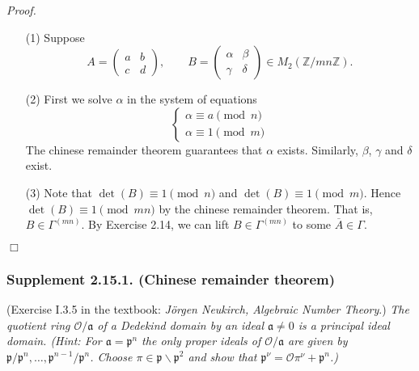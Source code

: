 \documentclass{article}
\begin{document}
\emph{Proof.}
\begin{enumerate}
\item[(1)]
  Suppose
  \[
    A =
    \begin{pmatrix}
      a & b \\
      c & d
    \end{pmatrix}, \qquad
    B =
    \begin{pmatrix}
      \alpha & \beta \\
      \gamma & \delta
    \end{pmatrix} \in M_2(\mathbb{Z}/mn\mathbb{Z}).
  \]

\item[(2)]
  First we solve $\alpha$ in the system of equations
  \begin{equation*}
    \begin{cases}
      \alpha \equiv a \pmod{n} \\
      \alpha \equiv 1 \pmod{m}
    \end{cases}
  \end{equation*}
  The chinese remainder theorem guarantees that $\alpha$ exists.
  Similarly, $\beta$, $\gamma$ and $\delta$ exist.

\item[(3)]
  Note that $\det(B) \equiv 1 \pmod{n}$ and $\det(B) \equiv 1 \pmod{m}$.
  Hence $\det(B) \equiv 1 \pmod{mn}$ by the chinese remainder theorem.
  That is, $B \in \Gamma^{(mn)}$.
  By Exercise 2.14, we can lift $B \in \Gamma^{(mn)}$ to some $\overline{A} \in \Gamma$.
\end{enumerate}
$\Box$ \\



\subsubsection*{Supplement 2.15.1. (Chinese remainder theorem)}
(Exercise I.3.5 in the textbook: \emph{J\"orgen Neukirch, Algebraic Number Theory}.)
\emph{The quotient ring $\mathcal{O}/\mathfrak{a}$ of a Dedekind domain by
an ideal $\mathfrak{a} \neq 0$ is a principal ideal domain.
(Hint: For $\mathfrak{a} = \mathfrak{p}^n$ the only proper ideals of $\mathcal{O}/\mathfrak{a}$
are given by $\mathfrak{p}/\mathfrak{p}^n, \ldots, \mathfrak{p}^{n-1}/\mathfrak{p}^n$.
Choose $\pi \in \mathfrak{p} \smallsetminus \mathfrak{p}^2$
and show that $\mathfrak{p}^{\nu} = \mathcal{O}\pi^{\nu} + \mathfrak{p}^n$.)} \\
\end{document}
